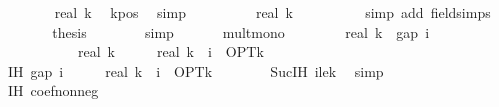 \begin{isabellebody}
\ \ \ \ \isamarkupfalse%
\ {\isachardoublequoteopen}{}\ {\isasymle}\ real\ k{\isachardoublequoteclose}\ \isamarkupfalse%
\ k{\isacharunderscore}{\kern0pt}pos\ \isamarkupfalse%
\ simp\isanewline
\ \ \ \ \isamarkupfalse%
\ \isamarkupfalse%
\ {\isachardoublequoteopen}{}\ {\isacharslash}{\kern0pt}\ real\ k\ {\isasymle}\ {}{\isachardoublequoteclose}\isanewline
\ \ \ \ \ \ \isamarkupfalse%
\ {\isacharparenleft}{\kern0pt}simp\ add{\isacharcolon}{\kern0pt}\ field{\isacharunderscore}{\kern0pt}simps{\isacharparenright}{\kern0pt}\isanewline
\ \ \ \ \isamarkupfalse%
\ \isamarkupfalse%
\ {\isacharquery}{\kern0pt}thesis\isanewline
\ \ \ \ \ \ \isamarkupfalse%
\ simp\isanewline
\ \ \isamarkupfalse%
\isanewline
\isanewline
\ \ \isamarkupfalse%
\ mult{\isacharunderscore}{\kern0pt}mono{\isacharcolon}{\kern0pt}\isanewline
\ \ \ \ {\isachardoublequoteopen}{\isacharparenleft}{\kern0pt}{}\ {\isacharminus}{\kern0pt}\ {}\ {\isacharslash}{\kern0pt}\ real\ k{\isacharparenright}{\kern0pt}\ {\isacharasterisk}{\kern0pt}\ gap\ i\isanewline
\ \ \ \ \ \ {\isasymle}\ {\isacharparenleft}{\kern0pt}{}\ {\isacharminus}{\kern0pt}\ {}\ {\isacharslash}{\kern0pt}\ real\ k{\isacharparenright}{\kern0pt}\ {\isacharasterisk}{\kern0pt}\ {\isacharparenleft}{\kern0pt}{\isacharparenleft}{\kern0pt}{}\ {\isacharminus}{\kern0pt}\ {}\ {\isacharslash}{\kern0pt}\ real\ k{\isacharparenright}{\kern0pt}\ {\isacharcircum}{\kern0pt}\ i\ {\isacharasterisk}{\kern0pt}\ OPT{\isacharunderscore}{\kern0pt}k{\isacharparenright}{\kern0pt}{\isachardoublequoteclose}\isanewline
\ \ \isamarkupfalse%
\ {\isacharminus}{\kern0pt}\isanewline
\ \ \ \ \isamarkupfalse%
\ IH{\isacharcolon}{\kern0pt}\ {\isachardoublequoteopen}gap\ i\ {\isasymle}\ {\isacharparenleft}{\kern0pt}{}\ {\isacharminus}{\kern0pt}\ {}\ {\isacharslash}{\kern0pt}\ real\ k{\isacharparenright}{\kern0pt}\ {\isacharcircum}{\kern0pt}\ i\ {\isacharasterisk}{\kern0pt}\ OPT{\isacharunderscore}{\kern0pt}k{\isachardoublequoteclose}\isanewline
\ \ \ \ \ \ \isamarkupfalse%
\ Suc{\isachardot}{\kern0pt}IH\ i{\isacharunderscore}{\kern0pt}le{\isacharunderscore}{\kern0pt}k\ \isamarkupfalse%
\ simp\isanewline
\ \ \ \ \isamarkupfalse%
\ IH\ coef{\isacharunderscore}{\kern0pt}nonneg\ \isamarkupfalse%

\end{isabellebody}
